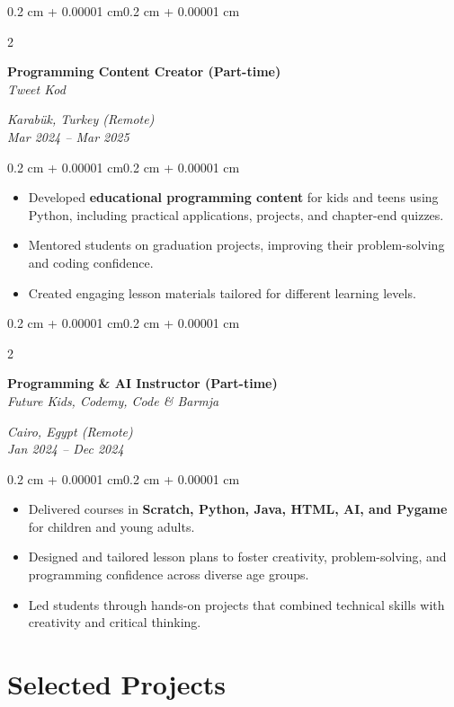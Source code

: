 \documentclass[10pt, letterpaper]{article}
\newenvironment{highlights}{
  \begin{itemize}[
    topsep=0.10 cm,
    parsep=0.10 cm,
    partopsep=0pt,
    itemsep=0pt,
    leftmargin=0.4 cm + 10pt
  ]}
  {\end{itemize}
}
\newenvironment{onecolentry}{
  \begin{adjustwidth}{0.2 cm + 0.00001 cm}{0.2 cm + 0.00001 cm}
}{
  \end{adjustwidth}
}
\newenvironment{twocolentry}[2][]{
  \onecolentry
  \def\secondColumn{#2}
  \setcolumnwidth{\fill, 4.5 cm}
  \begin{paracol}{2}
}{
  \switchcolumn \raggedleft \secondColumn
  \end{paracol}
  \endonecolentry
}
\begin{document}
\begin{twocolentry}{
  \textit{Karabük, Turkey (Remote)} \\
  \textit{Mar 2024 -- Mar 2025}}
  \textbf{Programming Content Creator (Part-time)} \\
  \textit{Tweet Kod}
\end{twocolentry}
\vspace{0.10 cm}
\begin{onecolentry}
  \begin{highlights}
    \item Developed \textbf{educational programming content} for kids and teens using Python, including practical applications, projects, and chapter-end quizzes.
    \item Mentored students on graduation projects, improving their problem-solving and coding confidence.
    \item Created engaging lesson materials tailored for different learning levels.
  \end{highlights}
\end{onecolentry}

\begin{twocolentry}{
  \textit{Cairo, Egypt (Remote)} \\
  \textit{Jan 2024 -- Dec 2024}}
  \textbf{Programming \& AI Instructor (Part-time)} \\
  \textit{Future Kids, Codemy, Code \& Barmja}
\end{twocolentry}
\vspace{0.10 cm}
\begin{onecolentry}
  \begin{highlights}
    \item Delivered courses in \textbf{Scratch, Python, Java, HTML, AI, and Pygame} for children and young adults.
    \item Designed and tailored lesson plans to foster creativity, problem-solving, and programming confidence across diverse age groups.
    \item Led students through hands-on projects that combined technical skills with creativity and critical thinking.
  \end{highlights}
\end{onecolentry}

\section{Selected Projects}
\end{document}
